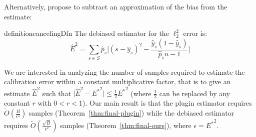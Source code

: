 Alternatively, \cite{brocker2012empirical, ferro2012bias} propose to subtract an approximation of the bias from the estimate:

\begin{restatable}{definition}{cancelingDfn}
  The debiased estimator for the $\ell_2^2$ error is:
\[ \hat{E}^2 = \sum_{s \in S} \hat{p}_s \Big[ (s - \hat{y}_s)^2 - \frac{\hat{y}_s(1 - \hat{y}_s)}{\hat{p}_sn-1} \Big] \]
\end{restatable}

We are interested in analyzing the number of samples required to estimate the calibration error within a constant multiplicative factor, that is to give an estimate $\hat{E}^2$ such that $\lvert \hat{E}^2 - {E^*}^2 \rvert \leq \frac{1}{2}{E^*}^2$ (where $\frac{1}{2}$ can be replaced by any constant $r$ with $0 < r < 1$). Our main result is that the plugin estimator requires $\widetilde{O}(\frac{B}{\epsilon^2})$ samples (Theorem~\ref{thm:final-plugin}) while the debiased estimator requires $\widetilde{O}(\frac{\sqrt{B}}{\epsilon^2})$ samples (Theorem~\ref{thm:final-ours}), where $\epsilon = {E^*}^2$.





